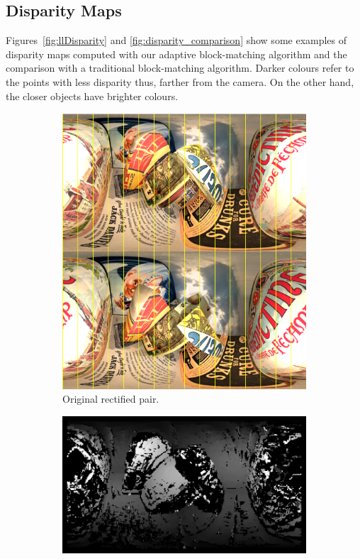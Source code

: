 \subsection{Disparity Maps}
Figures~\ref{fig:llDisparity} and \ref{fig:disparity_comparison}
show some examples of disparity maps computed
with our adaptive block-matching algorithm and the comparison with a
traditional block-matching algorithm. Darker colours refer to the points
with less disparity thus, farther from the camera. On the other hand, the closer
objects have brighter colours.
%
\begin{figure}[h]
\centering
	\begin{subfigure}{0.6\linewidth}
		\centering
		\includegraphics[width=\linewidth]{img/rectified_pair.png}
		\caption{Original rectified pair.}
	\end{subfigure}
	\begin{subfigure}{0.6\linewidth}
		\centering
		\includegraphics[width=\linewidth]{img/lldisparity2.png}

\end{subfigure}
\end{figure}
